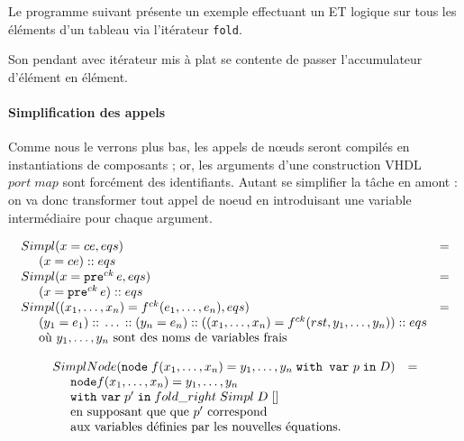 \documentclass[a4paper]{article}
\newcommand{\mybox}[1]{\mbox{\tt{#1}}}
\newcommand{\ind}[0]{\hspace{0.5cm}}
\newcommand{\Cons}[0]{\; \mathbf{::} \;}
\newcommand{\Node}[4]{\mybox{node} \; f(#1) = #2 \; \mybox{with var} \
  #3 \; \mybox{in} \; #4}
\newcommand{\Pre}[1]{\mybox{pre}^{ck} \, #1}
\newcommand{\App}[2]{#1^{ck}(#2)}
\begin{document}
Le programme suivant pr\'esente un exemple effectuant un ET logique sur tous les
\'el\'ements d'un tableau via l'it\'erateur \texttt{fold}.



Son pendant avec it\'erateur mis \`a plat se contente de passer l'accumulateur
d'\'el\'ement en \'el\'ement.



\paragraph{Simplification des appels}

Comme nous le verrons plus bas, les appels de nœuds seront compil\'es en
instantiations de composants ; or, les arguments d'une construction VHDL $port
\; map$ sont forc\'ement des identifiants. Autant se simplifier la t\^ache en amont
: on va donc transformer tout appel de noeud en introduisant une variable
interm\'ediaire pour chaque argument.

\newcommand{\simpl}[2]{Simpl(#1,#2)}
\newcommand{\simplnd}[1]{SimplNode(#1)}

\[
\begin{array}{ll}
  \simpl{x = ce}{eqs} & = \\
  \ind (x = ce) \Cons eqs \\
  \simpl{x = \Pre{e}}{eqs} & = \\
  \ind (x = \Pre{e}) \Cons eqs \\

  \simpl{(x_1,\dots,x_n) = \App{f}{e_1,\dots,e_n}}{eqs} & = \\
  \ind (y_1 = e_1) \Cons \dots \Cons (y_n = e_n)
  \Cons ((x_1,\dots,x_n) = \App{f}{rst,y_1,\dots,y_n}) \Cons eqs \\
  \ind \mbox{o\`u } y_1,\dots,y_n \mbox{ sont des noms de variables frais}
\end{array}
\]

\[
\begin{array}{ll}
  \simplnd{\Node{x_1,\dots,x_n}{y_1,\dots,y_n}{p}{D}} & = \\
  \ind \mathtt{node} f(x_1,\dots,x_n) = y_1, \dots, y_n \; \\
  \ind \mathtt{with} \  \mathtt{var} \; p' \; \mathtt{in} \; fold\_right \;Simpl
  \; D \; [] \\
  \ind \mbox{en supposant que que } p' \mbox{ correspond} \\
  \ind \mbox{aux variables d\'efinies par les nouvelles \'equations.}
\end{array}
\]
\end{document}
